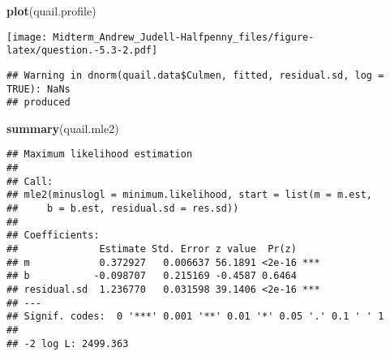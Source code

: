 \documentclass[]{article}
\newenvironment{Shaded}{\begin{snugshade}}{\end{snugshade}}
\newcommand{\KeywordTok}[1]{\textcolor[rgb]{0.13,0.29,0.53}{\textbf{#1}}}
\newcommand{\DataTypeTok}[1]{\textcolor[rgb]{0.13,0.29,0.53}{#1}}
\newcommand{\DecValTok}[1]{\textcolor[rgb]{0.00,0.00,0.81}{#1}}
\newcommand{\StringTok}[1]{\textcolor[rgb]{0.31,0.60,0.02}{#1}}
\newcommand{\OtherTok}[1]{\textcolor[rgb]{0.56,0.35,0.01}{#1}}
\newcommand{\ControlFlowTok}[1]{\textcolor[rgb]{0.13,0.29,0.53}{\textbf{#1}}}
\newcommand{\OperatorTok}[1]{\textcolor[rgb]{0.81,0.36,0.00}{\textbf{#1}}}
\newcommand{\NormalTok}[1]{#1}
\begin{document}
\begin{Shaded}
\begin{Highlighting}[]
\KeywordTok{plot}\NormalTok{(quail.profile)}
\end{Highlighting}
\end{Shaded}

\texttt{[image: Midterm\_Andrew\_Judell-Halfpenny\_files/figure-latex/question.-5.3-2.pdf]}

\begin{Shaded}
\end{Shaded}

\begin{verbatim}
## Warning in dnorm(quail.data$Culmen, fitted, residual.sd, log = TRUE): NaNs
## produced
\end{verbatim}

\begin{Shaded}
\begin{Highlighting}[]
\KeywordTok{summary}\NormalTok{(quail.mle2)}
\end{Highlighting}
\end{Shaded}

\begin{verbatim}
## Maximum likelihood estimation
## 
## Call:
## mle2(minuslogl = minimum.likelihood, start = list(m = m.est, 
##     b = b.est, residual.sd = res.sd))
## 
## Coefficients:
##              Estimate Std. Error z value  Pr(z)    
## m            0.372927   0.006637 56.1891 <2e-16 ***
## b           -0.098707   0.215169 -0.4587 0.6464    
## residual.sd  1.236770   0.031598 39.1406 <2e-16 ***
## ---
## Signif. codes:  0 '***' 0.001 '**' 0.01 '*' 0.05 '.' 0.1 ' ' 1
## 
## -2 log L: 2499.363
\end{verbatim}
\end{document}

